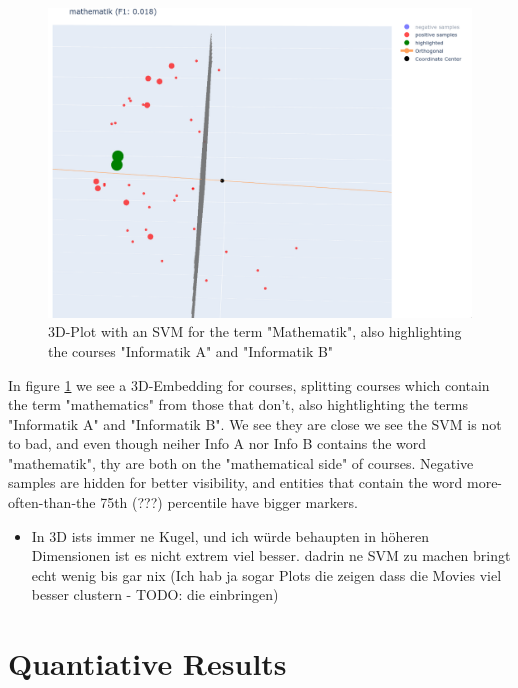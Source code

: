 \documentclass[11pt,
  paper=a4, 
  twoside,  %
  hidelinks,
  bibliography=totocnumbered,
	captions=tableheading,
	BCOR=10mm
]{scrreprt}
\theoremstyle{definition}
\def \figwidth {0.9\linewidth}
\begin{document}
\begin{figure}[H]
	\centering
	\includegraphics[width=\figwidth]{svm_mathematik_highlight_infoAB.png}
	\caption[3D-Plot with an SVM for the term "Mathematik"]{
		\label{fig:3dplot_mathe_infoab}
		3D-Plot with an SVM for the term "Mathematik", also highlighting the courses "Informatik A" and "Informatik B"
	}
\end{figure}

In figure \ref{fig:3dplot_mathe_infoab} we see a 3D-Embedding for courses, splitting courses which contain the term "mathematics" from those that don't, also hightlighting the terms "Informatik A" and "Informatik B". We see they are close we see the SVM is not to bad, and even though neiher Info A nor Info B contains the word "mathematik", thy are both on the "mathematical side" of courses. Negative samples are hidden for better visibility, and entities that contain the word more-often-than-the 75th (???) percentile have bigger markers.


\begin{itemize}
	\item In 3D ists immer ne Kugel, und ich würde behaupten in höheren Dimensionen ist es nicht extrem viel besser. dadrin ne SVM zu machen bringt echt wenig bis gar nix (Ich hab ja sogar Plots die zeigen dass die Movies viel besser clustern - TODO: die einbringen)
\end{itemize}


\section{Quantiative Results}
\end{document}
